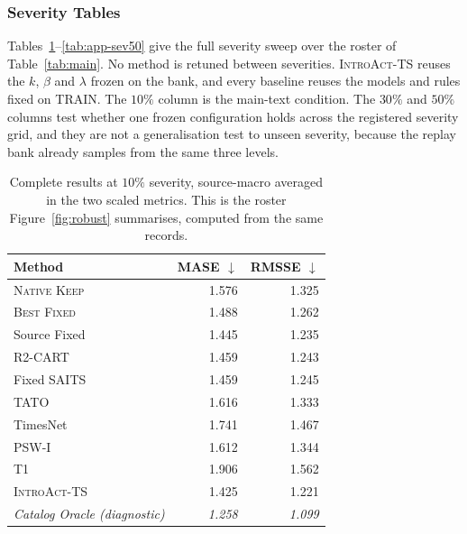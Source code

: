 \documentclass{article}
\newcommand{\oracle}[1]{\textit{\textcolor{phgray}{#1}}}
\newcommand{\introact}{\textsc{IntroAct-TS}}
\begin{document}
\subsubsection{Severity Tables}
\label{app:severity}
Tables~\ref{tab:app-sev10}--\ref{tab:app-sev50} give the full severity sweep over the roster of
Table~\ref{tab:main}. No method is retuned
between severities. \introact{} reuses the $k$, $\beta$ and $\lambda$ frozen on the bank, and every
baseline reuses the models and rules fixed on TRAIN. The $10\%$ column is the main-text
condition. The $30\%$ and $50\%$ columns test whether one frozen configuration holds across
the registered severity grid, and they are not a generalisation test to unseen severity,
because the replay bank already samples from the same three levels.\begin{table}[htbp]
  \caption{Complete results at $10\%$ severity, source-macro averaged in the two scaled metrics. This is the roster Figure~\ref{fig:robust} summarises, computed from the same records.}
  \label{tab:app-sev10}
  \centering
  \small
  \setlength{\tabcolsep}{4pt}
\begin{tabular*}{\textwidth}{@{\extracolsep{\fill}}lrr@{}}
    \toprule
    Method & MASE $\downarrow$ & RMSSE $\downarrow$ \\
    \midrule
    \textsc{Native Keep} & 1.576 & 1.325 \\
    \textsc{Best Fixed} & 1.488 & 1.262 \\
    Source Fixed & 1.445 & 1.235 \\
    R2-CART & 1.459 & 1.243 \\
    Fixed SAITS & 1.459 & 1.245 \\
    TATO & 1.616 & 1.333 \\
    TimesNet & 1.741 & 1.467 \\
    PSW-I & 1.612 & 1.344 \\
    T1 & 1.906 & 1.562 \\
    \midrule
    \rowcolor{bestgray}\introact{} & 1.425 & 1.221 \\
    \midrule
    \oracle{Catalog Oracle (diagnostic)} & \oracle{1.258} & \oracle{1.099} \\
    \bottomrule
  \end{tabular*}
\end{table}
\end{document}
